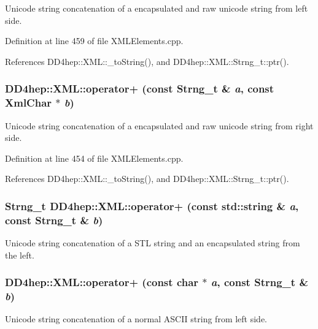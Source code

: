Unicode string concatenation of a encapsulated and raw unicode string from left side. 

Definition at line 459 of file XMLElements.cpp.

References DD4hep::XML::\_\-toString(), and DD4hep::XML::Strng\_\-t::ptr().\hypertarget{group___d_d4_h_e_p___x_m_l_ga80dcfab5263e77bc2580f30c7d0e4f2e}{
\subsubsection[{operator+}]{ DD4hep::XML::operator+ (const {\bf Strng\_\-t} \& {\em a}, \/  const XmlChar $\ast$ {\em b})}}
\label{group___d_d4_h_e_p___x_m_l_ga80dcfab5263e77bc2580f30c7d0e4f2e}


Unicode string concatenation of a encapsulated and raw unicode string from right side. 

Definition at line 454 of file XMLElements.cpp.

References DD4hep::XML::\_\-toString(), and DD4hep::XML::Strng\_\-t::ptr().\hypertarget{group___d_d4_h_e_p___x_m_l_gab7183a795b02243de6de9f3cd3665cb0}{
\subsubsection[{operator+}]{\setlength{\rightskip}{0pt plus 5cm}Strng\_\-t DD4hep::XML::operator+ (const std::string \& {\em a}, \/  const Strng\_\-t \& {\em b})}}
\label{group___d_d4_h_e_p___x_m_l_gab7183a795b02243de6de9f3cd3665cb0}


Unicode string concatenation of a STL string and an encapsulated string from the left. \hypertarget{group___d_d4_h_e_p___x_m_l_gad9d4f784bd934ca00c54efe28b42c7d2}{
\subsubsection[{operator+}]{ DD4hep::XML::operator+ (const char $\ast$ {\em a}, \/  const {\bf Strng\_\-t} \& {\em b})}}
\label{group___d_d4_h_e_p___x_m_l_gad9d4f784bd934ca00c54efe28b42c7d2}


Unicode string concatenation of a normal ASCII string from left side. 

